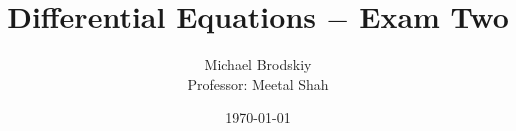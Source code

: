 \documentclass[12pt]{article}
\title{Differential Equations $-$ Exam Two}
\date{\today}
\author{Michael Brodskiy\\ \small Professor: Meetal Shah}
\begin{document}
\maketitle

\hline
\begin{equation}
  \begin{split}
  \end{split}
  \label{1}
\end{equation}
\hline

\begin{equation}
  \begin{split}
  \end{split}
  \label{2}
\end{equation}

\hline
\begin{equation}
  \begin{split}
  \end{split}
  \label{3}
\end{equation}

\hline
\begin{equation}
  \begin{split}
  \end{split}
  \label{4}
\end{equation}

\hline
\begin{equation}
  \begin{split}
  \end{split}
  \label{5}
\end{equation}
\hline

\begin{equation}
  \begin{split}
  \end{split}
  \label{6}
\end{equation}
\hline


\hline
\begin{equation}
  \begin{split}
  \end{split}
  \label{7}
\end{equation}
\hline

\begin{equation}
  \begin{split}
  \end{split}
  \label{8}
\end{equation}


\hline
\begin{equation}
  \begin{split}
  \end{split}
  \label{9}
\end{equation}

\hline
\begin{equation}
  \begin{split}
  \end{split}
  \label{10}
\end{equation}
\hline

\begin{equation}
  \begin{split}
  \end{split}
  \label{11}
\end{equation}
\hline
\end{document}
